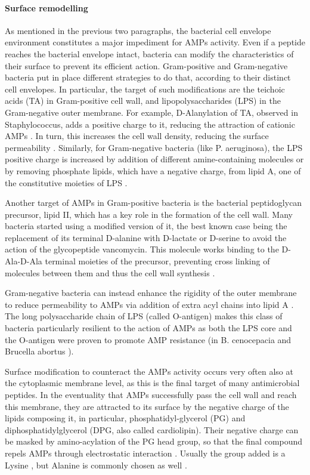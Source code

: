\paragraph{Surface remodelling}
As mentioned in the previous two paragraphs, the bacterial cell envelope environment constitutes a major impediment for AMPs activity.
%
Even if a peptide reaches the bacterial envelope intact, bacteria can modify the characteristics of their surface to prevent its efficient action.
%
Gram-positive and Gram-negative bacteria put in place different strategies to do that, according to their distinct cell envelopes. In particular, the target of such modifications are the teichoic acids (TA) in Gram-positive cell wall, and lipopolysaccharides (LPS) in the Gram-negative outer membrane.
%
For example, D-Alanylation of TA, observed in Staphylococcus, adds a positive charge to it, reducing the attraction of cationic AMPs \cite{Peschel1999,Fabretti2006,Saar-Dover2012}.
%
In turn, this increases the cell wall density, reducing the surface permeability \cite{Saar-Dover2012}.
%
Similarly, for Gram-negative bacteria (like P. aeruginosa), the LPS positive charge is increased by addition of different amine-containing molecules \cite{Moskowitz2004,Gunn1998} or by removing phosphate lipids, which have a negative charge, from lipid A, one of the constitutive moieties of LPS \cite{Wang2004MsbA,Wang2006}.

Another target of AMPs in Gram-positive bacteria is the bacterial peptidoglycan precursor, lipid II, which has a key role in the formation of the cell wall. Many bacteria started using a modified version of it,
the best known case being the replacement of its terminal D-alanine with D-lactate or D-serine \cite{Bugg1991} to avoid the action of the glycopeptide vancomycin. This molecule works binding to the D-Ala-D-Ala terminal moieties of the precursor, preventing cross linking of molecules between them and thus the cell wall synthesis \cite{Brotz1998}.

Gram-negative bacteria can instead enhance the rigidity of the outer membrane to reduce permeability to AMPs via addition of extra acyl chains into lipid A \cite{Guo1998,Bishop2000}. The long polysaccharide chain of LPS (called O-antigen) makes this class of bacteria particularly resilient to the action of AMPs \cite{Silhavy2010} as both the LPS core and the O-antigen were proven to promote AMP resistance (in B. cenocepacia and Brucella abortus \cite{Loutet2006,Allen1998}).

Surface modification to counteract the AMPs activity occurs very often also at the cytoplasmic membrane level, as this is the final target of many antimicrobial peptides. In the eventuality that AMPs successfully pass the cell wall and reach this membrane, they are attracted to its surface by the negative charge of the lipids composing it, in particular, phosphatidyl-glycerol (PG) and diphosphatidylglycerol (DPG, also called cardiolipin). Their negative charge can be masked by amino-acylation of the PG head group, so that the final compound repels AMPs through electrostatic interaction \cite{Peschel2001}. Usually the group added is a Lysine \cite{Thedieck2006}, but Alanine is commonly chosen as well \cite{Klein2009}.

